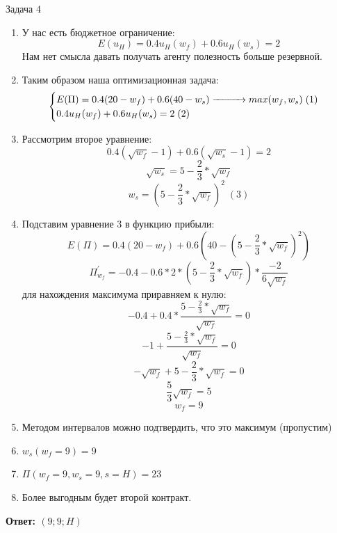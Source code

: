 \begin{mybox}{Задача 4}
\begin{enumerate}
        \item У нас есть бюджетное ограничение: $$E(u_H)=0.4u_H(w_f)+0.6u_H(w_s)=2$$ Нам нет смысла давать получать
        агенту полезность больше резервной.
        \item Таким образом наша оптимизационная задача: $$\begin{cases}
            E(\Pi)=0.4(20-w_f)+0.6(40-w_s)\xrightarrow{\makebox[1cm]{}} max(w_f,w_s) \;(1)\\
            0.4u_H(w_f)+0.6u_H(w_s)=2\; (2) \\
        \end{cases}$$
        \item Рассмотрим второе уравнение: $$0.4(\sqrt{w_f}-1)+0.6(\sqrt{w_s}-1)=2$$
        $$\sqrt{w_s}=5-\frac{2}{3}*\sqrt{w_f}$$
        $$w_s=(5-\frac{2}{3}*\sqrt{w_f})^2\;(3)$$
        \item Подставим уравнение 3 в функцию прибыли: $$E(\Pi)=0.4(20-w_f)+0.6(40-(5-\frac{2}{3}*\sqrt{w_f})^2)$$
        $$\Pi^{'}_{w_f}=-0.4-0.6*2*(5-\frac{2}{3}*\sqrt{w_f})*\frac{-2}{6\sqrt{w_f}}$$ для нахождения максимума
        приравняем к нулю:
        $$-0.4+0.4*\frac{5-\frac{2}{3}*\sqrt{w_f}}{\sqrt{w_f}}=0$$
        $$-1+\frac{5-\frac{2}{3}*\sqrt{w_f}}{\sqrt{w_f}}=0$$
        $$-\sqrt{w_f}+5-\frac{2}{3}*\sqrt{w_f}=0$$
        $$\frac{5}{3}\sqrt{w_f}=5$$
        $$w_f=9$$
        \item Методом интервалов можно подтвердить, что это максимум (пропустим)
        \item $w_s(w_f=9)=9$
        \item $\Pi(w_f=9, w_s=9, s=H)=23$
        \item Более выгодным будет второй контракт.
    \end{enumerate}
    \textbf{Ответ: $(9;9;H)$}\\\\


\end{mybox}
